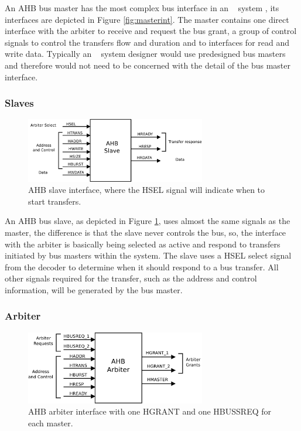  An AHB bus master has the most complex bus interface in an \amba~ system , its interfaces are depicted in Figure \ref{fig:masterint}. The master contains one direct interface with the arbiter to receive  and request the bus grant, a group of control signals to control the transfers flow and duration and to interfaces for read and write data.  Typically an \amba~ system designer would use predesigned bus masters and therefore would not need to be concerned with the detail of the bus master interface.



\subsubsection{Slaves}

\begin{figure}[!ht]
    \centering
    \includegraphics[width=0.7\textwidth]{figures/pdf/ahb_slave_new.pdf}
    \caption{AHB slave interface, where the HSEL signal will indicate when to start transfers.}
    \label{fig:slaveint}
\end{figure}
An AHB bus slave, as depicted in Figure \ref{fig:slaveint}, uses almost the same signals as the master, the difference is that the slave never controls the bus, so,  the interface with the arbiter is basically being selected as active and respond to transfers initiated by bus masters within the system. The slave uses a HSEL select signal from the decoder to determine when it should respond to a bus transfer. All other signals required for the transfer, such as the address and control information, will be generated by the bus master.
 
\subsubsection{Arbiter}
\begin{figure}[ht]
    \centering
    \includegraphics[width=0.7\textwidth]{figures/pdf/ahb_arbiter_new.pdf}
    \caption{AHB arbiter interface with one HGRANT and one HBUSSREQ for each master.}
    \label{fig:arbiterint}
\end{figure}

